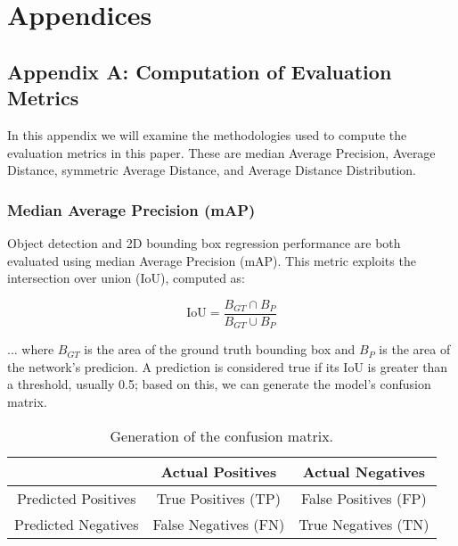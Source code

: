 \chapter*{Appendices}

\section*{Appendix A: Computation of Evaluation Metrics}

In this appendix we will examine the methodologies used to compute the evaluation metrics in this paper. These are median Average Precision, Average Distance, symmetric Average Distance, and Average Distance Distribution.

\subsection*{Median Average Precision (mAP)}

Object detection and 2D bounding box regression performance are both evaluated using median Average Precision (mAP). This metric exploits the intersection over union (IoU), computed as:

\begin{equation*}
    \text{IoU} = \frac{B_{GT} \cap B_{P}}{B_{GT} \cup B_{P}}
    \label{eq:IoU}
\end{equation*}

... where $B_{GT}$ is the area of the ground truth bounding box and $B_{P}$ is the area of the network's predicion. A prediction is considered true if its IoU is greater than a threshold, usually 0.5; based on this, we can generate the model's confusion matrix.

\begin{table}[ht]
    \begin{center}
        \begin{tabular}{c||c|c}
            \space & Actual Positives & Actual Negatives\\
            \hline\hline
            Predicted Positives & True Positives (TP)& False Positives (FP)\\
            \hline
            Predicted Negatives & False Negatives (FN)& True Negatives (TN)\\
        \end{tabular}
        \caption{Generation of the confusion matrix.}
    \end{center}
\end{table}

